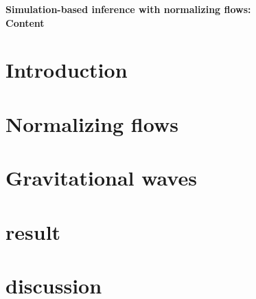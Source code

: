 \documentclass{article}
\begin{document}
\begin{center}{\Large \textbf{
    Simulation-based inference with normalizing flows:\\
    Content
    }}
\end{center}

\section{Introduction}


\section{Normalizing flows}


\section{Gravitational waves}



\section{result}


\section{discussion}

\end{document}
